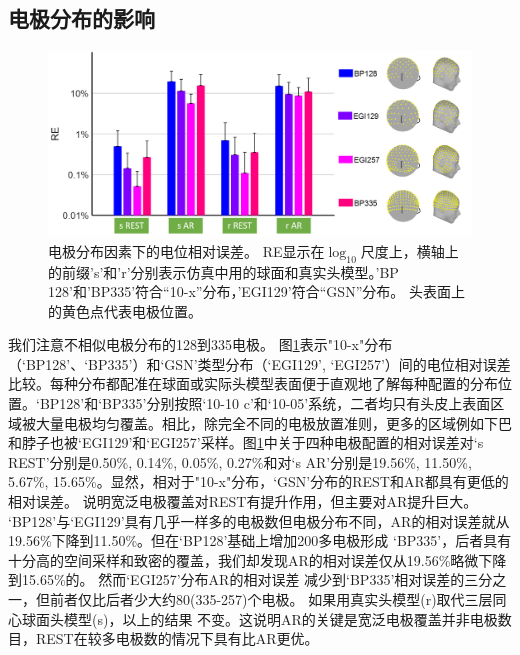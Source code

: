\subsection{电极分布的影响}
\begin{figure}[!ht]
	\centering
	\includegraphics[width=15cm]{pic/JNE/figure5.png}
	\caption{电极分布因素下的电位相对误差。 RE显示在$\log_{10}$尺度上，横轴上的前缀's'和'r'分别表示仿真中用的球面和真实头模型。'BP
	128'和'BP335'符合“10-x”分布，'EGI129'符合“GSN”分布。 头表面上的黄色点代表电极位置。}
	\label{2.5}
\end{figure}
我们注意不相似电极分布的128到335电极。 图\ref{2.5}表示"10-x"分布（‘BP128’、‘BP335’）和‘GSN’类型分布（‘EGI129’, ‘EGI257’）间的电位相对误差比较。每种分布都配准在球面或实际头模型表面便于直观地了解每种配置的分布位置。‘BP128’和‘BP335’分别按照‘10-10 c’和‘10-05’系统，二者均只有头皮上表面区域被大量电极均匀覆盖。相比，除完全不同的电极放置准则，更多的区域例如下巴和脖子也被‘EGI129’和‘EGI257’采样。图\ref{2.5}中关于四种电极配置的相对误差对‘s REST’分别是0.50\%, 0.14\%, 0.05\%, 0.27\%和对‘s AR’分别是19.56\%, 11.50\%, 5.67\%, 15.65\%。显然，相对于"10-x"分布，‘GSN’分布的REST和AR都具有更低的相对误差。 说明宽泛电极覆盖对REST有提升作用，但主要对AR提升巨大。
‘BP128’与‘EGI129’具有几乎一样多的电极数但电极分布不同，AR的相对误差就从19.56\%下降到11.50\%。但在‘BP128’基础上增加200多电极形成
‘BP335’，后者具有十分高的空间采样和致密的覆盖，我们却发现AR的相对误差仅从19.56\%略微下降到15.65\%的。 然而‘EGI257’分布AR的相对误差
减少到‘BP335’相对误差的三分之一，但前者仅比后者少大约80(335-257)个电极。 如果用真实头模型(r)取代三层同心球面头模型(s)，以上的结果
不变。这说明AR的关键是宽泛电极覆盖并非电极数目，REST在较多电极数的情况下具有比AR更优。

